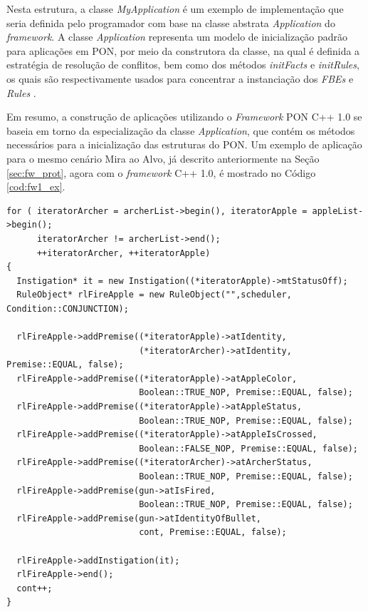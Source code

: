 Nesta estrutura, a classe \textit{MyApplication} é um exemplo de implementação
que seria definida pelo programador com base na classe abstrata
\textit{Application} do \textit{framework}. A classe \textit{Application}
representa um modelo de inicialização padrão para aplicações em PON, por meio da
construtora da classe, na qual é definida a estratégia de resolução de
conflitos, bem como dos métodos \textit{initFacts} e \textit{initRules}, os
quais são respectivamente usados para concentrar a instanciação dos
\textit{FBEs} e \textit{Rules} \cite{msc_Banaszewski_2009}.

Em resumo, a construção de aplicações utilizando o \textit{Framework} PON C++
1.0 se baseia em torno da especialização da classe \textit{Application}, que
contém os métodos necessários para a inicialização das estruturas do PON. Um
exemplo de aplicação para o mesmo cenário Mira ao Alvo, já descrito
anteriormente na Seção \ref{sec:fw_prot}, agora com o \textit{framework} C++
1.0, é mostrado no Código \ref{cod:fw1_ex}.

\begin{lstlisting}[caption = {Exemplo de programa com o \textit{framework} C++ 1.0},
source = {Adaptado de \citeonline{msc_Banaszewski_2009}},
   label = {cod:fw1_ex}, float=htb]
for ( iteratorArcher = archerList->begin(), iteratorApple = appleList->begin(); 
      iteratorArcher != archerList->end();
      ++iteratorArcher, ++iteratorApple)
{	
  Instigation* it = new Instigation((*iteratorApple)->mtStatusOff);
  RuleObject* rlFireApple = new RuleObject("",scheduler, Condition::CONJUNCTION);

  rlFireApple->addPremise((*iteratorApple)->atIdentity,
                          (*iteratorArcher)->atIdentity, Premise::EQUAL, false);
  rlFireApple->addPremise((*iteratorApple)->atAppleColor,
                          Boolean::TRUE_NOP, Premise::EQUAL, false);
  rlFireApple->addPremise((*iteratorApple)->atAppleStatus,
                          Boolean::TRUE_NOP, Premise::EQUAL, false);
  rlFireApple->addPremise((*iteratorApple)->atAppleIsCrossed,
                          Boolean::FALSE_NOP, Premise::EQUAL, false);
  rlFireApple->addPremise((*iteratorArcher)->atArcherStatus,
                          Boolean::TRUE_NOP, Premise::EQUAL, false);
  rlFireApple->addPremise(gun->atIsFired,
                          Boolean::TRUE_NOP, Premise::EQUAL, false);
  rlFireApple->addPremise(gun->atIdentityOfBullet,
                          cont, Premise::EQUAL, false);

  rlFireApple->addInstigation(it);
  rlFireApple->end();
  cont++;
}
\end{lstlisting}

